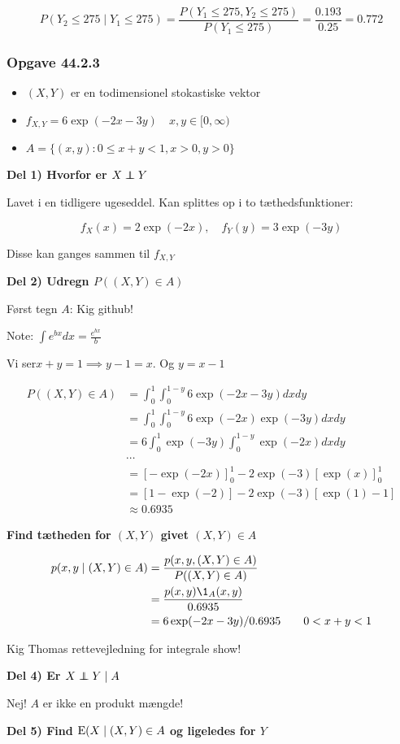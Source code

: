 \begin{equation}
    P(Y_2 \leq 275 \mid Y_1 \leq 275) =  \frac{P(Y_1 \leq 275, Y_2 \leq 275) }{P(Y_1\leq 275)} = \frac{0.193}{0.25} = 0.772
\end{equation}

\subsubsection{Opgave 44.2.3}

\begin{itemize}
    \item $(X,Y)$ er en todimensionel stokastiske vektor
    \item $f_{X,Y} = 6 \exp(-2x-3y) \quad x,y \in [0,\infty)$
    \item $A = \{(x,y) : 0 \leq x + y< 1, x>0, y >0\}$
\end{itemize}

\textbf{Del 1) Hvorfor er $X \independent Y$}

Lavet i en tidligere ugeseddel. Kan splittes op i to tæthedsfunktioner:

\begin{equation}
    f_X(x) = 2 \exp(-2x), \quad f_Y (y) = 3 \exp(-3y)
\end{equation}

Disse kan ganges sammen til $f_{X,Y}$

\textbf{Del 2) Udregn $P((X,Y)\in A)$}

Først tegn $A$: Kig github!

Note: $\int e^{bx}dx = \frac{e^{bx}}{b}$ 

Vi ser$ x+y = 1 \implies y-1 = x$. Og $y = x- 1$

\begin{align}
    P((X,Y) \in A) &= \int_0^1\int_0^{1-y} 6\exp(-2x-3y) dx dy\\
    &= \int_0^1 \int_0^{1-y} 6\exp(-2x)\exp(-3y) dx dy \\
    &=6 \int_0^{1}\exp(-3y)\int_0^{1-y}\exp(-2x) dx dy \\
    &\cdots \\
    &= [- \exp(-2x)]_{0}^{1} - 2\exp(-3)[\exp(x)]_{0}^{1} \\
    &= [1-\exp(-2)] - 2 \exp(-3)[\exp(1)-1] \\
    &\approx 0.6935
\end{align}

\textbf{Find tætheden for $(X,Y)$ givet $(X,Y) \in A$}

\begin{align}
    p(x,y \mid (X,Y) \in A) &= \frac{p(x,y, (X,Y) \in A)}{P((X,Y) \in A)} \\
    &= \frac{p(x,y) \1_A(x,y)}{0.6935} \\
    &= 6\exp(-2x -3y) / 0.6935 \qquad 0< x+ y <1
\end{align}

Kig Thomas rettevejledning for integrale show!

\textbf{Del 4) Er $X\independent Y \mid A$}

Nej! $A$ er ikke en produkt mængde!

\textbf{Del 5) Find $\text{E}(X \mid (X,Y) \in A$ og ligeledes for $Y$}

